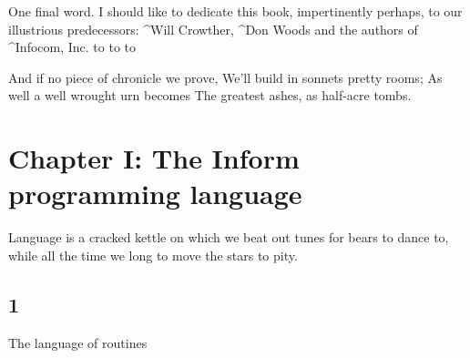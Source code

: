 One final word.  I should like to dedicate this book, impertinently perhaps,
to our illustrious predecessors: ^{Will Crowther}, ^{Don Woods} and
the authors of ^{Infocom, Inc.}
\medskip
\hbox to
\hbox to
\hbox to
\bigskip\medskip

\poem
And if no piece of chronicle we prove,
We'll build in sonnets pretty rooms;
As well a well wrought urn becomes
The greatest ashes, as half-acre tombs.

\newpage


\chapter{Chapter I: The Inform programming language}

\vskip 0.5in
\quote
Language is a cracked kettle on which we beat out tunes
for bears to dance to, while all the time we long to move
the stars to pity.

\section{1}{The language of routines}

\def\asection#1#2{\bigbreak\noindent{\bf \S 1.#1\quad #2}\medskip\noindent}

